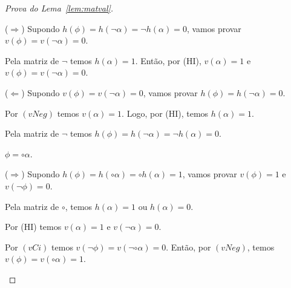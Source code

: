 \begin{proof}[Prova do Lema~\ref{lem:matval}]
\begin{provaporcasos}
\begin{provaporsubcasos}
                        
                        ($\Longrightarrow$) Supondo $h(\phi) = h(\neg \alpha) = \neg h(\alpha) = 0$, vamos provar $v(\phi) = v(\neg \alpha) = 0$.
                        
                        Pela matriz de $\neg$ temos $h(\alpha) = 1$. Então, por (HI), $v(\alpha) = 1$ e $v(\phi) = v(\neg \alpha) = 0$.
                    
                        ($\Longleftarrow$) Supondo $v(\phi) = v(\neg \alpha) = 0$, vamos provar $h(\phi) = h(\neg \alpha) = 0$.
                    
                        Por $(vNeg)$ temos $v(\alpha) = 1$. Logo, por (HI), temos $h(\alpha) = 1$.
                        
                        Pela matriz de $\neg$ temos $h(\phi) = h(\neg \alpha) = \neg h(\alpha) = 0$.
                \end{provaporsubcasos}
                    
            \casodeprova{} $\phi = \circ \alpha$.
                    
                \begin{provaporsubcasos}
                    

                        ($\Longrightarrow$) Supondo $h(\phi) = h(\circ \alpha) = \circ h(\alpha) = 1$, vamos provar $v(\phi) = 1$ e $v(\neg \phi) = 0$.
                        
                        Pela matriz de $\circ$, temos $h(\alpha) = 1$ ou $h(\alpha) = 0$.

                        \begin{provaporsubsubcasos}
                                
                                Por (HI) temos $v(\alpha) = 1$ e $v(\neg \alpha) = 0$.
                            
                                Por $(vCi)$ temos $v(\neg \phi) = v(\neg \circ \alpha) = 0$. Então, por $(vNeg)$, temos $v(\phi) = v(\circ \alpha) = 1$.
                            
                                

\end{provaporsubsubcasos}
\end{provaporsubcasos}
\end{provaporcasos}
\end{proof}
